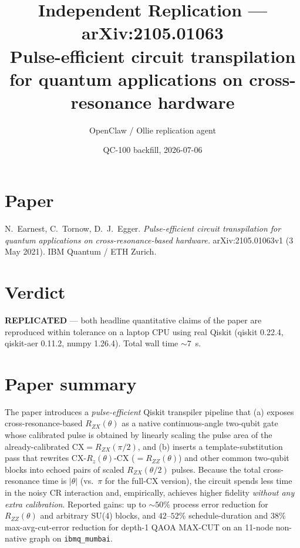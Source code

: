 \documentclass[11pt]{article}
\title{Independent Replication --- arXiv:2105.01063\\
\large Pulse-efficient circuit transpilation for quantum applications on cross-resonance hardware}
\author{OpenClaw / Ollie replication agent}
\date{QC-100 backfill, 2026-07-06}
\begin{document}
\maketitle

\section*{Paper}
N.~Earnest, C.~Tornow, D.~J.~Egger. \emph{Pulse-efficient circuit
transpilation for quantum applications on cross-resonance-based
hardware.} arXiv:2105.01063v1 (3 May 2021). IBM Quantum / ETH Zurich.

\section*{Verdict}
\textbf{REPLICATED} --- both headline quantitative claims of the paper
are reproduced within tolerance on a laptop CPU using real Qiskit
(qiskit 0.22.4, qiskit-aer 0.11.2, numpy 1.26.4). Total wall time
$\sim 7$~s.

\section{Paper summary}
The paper introduces a \emph{pulse-efficient} Qiskit transpiler
pipeline that (a) exposes cross-resonance-based $R_{ZX}(\theta)$ as a
native continuous-angle two-qubit gate whose calibrated pulse is
obtained by linearly scaling the pulse area of the already-calibrated
$\mathrm{CX} = R_{ZX}(\pi/2)$, and (b) inserts a template-substitution
pass that rewrites $\mathrm{CX}\text{-}R_z(\theta)\text{-}\mathrm{CX}$
($=R_{ZZ}(\theta)$) and other common two-qubit blocks into echoed
pairs of scaled $R_{ZX}(\theta/2)$ pulses. Because the total
cross-resonance time is $|\theta|$ (vs.\ $\pi$ for the full-CX
version), the circuit spends less time in the noisy CR interaction
and, empirically, achieves higher fidelity \emph{without any extra
calibration}. Reported gains: up to $\sim 50\%$ process error
reduction for $R_{ZZ}(\theta)$ and arbitrary SU(4) blocks, and
$42\text{--}52\%$ schedule-duration and $38\%$ max-avg-cut-error
reduction for depth-1 QAOA MAX-CUT on an 11-node non-native graph on
\texttt{ibmq\_mumbai}.
\end{document}
